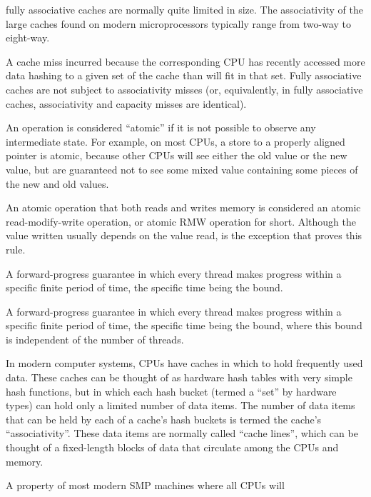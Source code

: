 \begin{description}
	fully associative caches are normally quite limited in size.
	The associativity of the large caches found on modern microprocessors
	typically range from two-way to eight-way.
\item[\IXGalth{Associativity Miss}{associativity}{cache miss}:]
	A cache miss incurred because the corresponding CPU has recently
	accessed more data hashing to a given set of the cache than will
	fit in that set.
	Fully associative caches are not subject to associativity misses
	(or, equivalently, in fully associative caches, associativity
	and capacity misses are identical).
\item[\IXG{Atomic}:]
	An operation is considered ``atomic'' if it is not possible to
	observe any intermediate state.
	For example, on most CPUs, a store to a properly aligned pointer
	is atomic, because other CPUs will see either the old value or
	the new value, but are guaranteed not to see some mixed value
	containing some pieces of the new and old values.
\item[\IXG{Atomic Read-Modify-Write Operation}:]
	An atomic operation that both reads and writes memory is
	considered an atomic read-modify-write operation, or atomic RMW
	operation for short.
	Although the value written usually depends on the value read,
	 is the exception that proves this rule.
\item[\IXGh{Bounded}{Wait Free}:]
	A forward-progress guarantee in which every thread makes
	progress within a specific finite period of time, the specific
	time being the bound.
\item[\IXGh{Bounded Population-Oblivious}{Wait Free}:]
	A forward-progress guarantee in which every thread makes
	progress within a specific finite period of time, the specific
	time being the bound, where this bound is independent of the
	number of threads.
\item[\IXG{Cache}:]
	In modern computer systems, CPUs have caches in which to hold
	frequently used data.
	These caches can be thought of as hardware hash tables with very
	simple hash functions,
	but in which each hash bucket (termed a ``set'' by hardware types)
	can hold only a limited number of data items.
	The number of data items that can be held by each of a cache's hash
	buckets is termed the cache's ``associativity''.
	These data items are normally called ``cache lines'', which
	can be thought of a fixed-length blocks of data that circulate
	among the CPUs and memory.
\item[\IXG{Cache Coherence}:]
	A property of most modern SMP machines where all CPUs will

\end{description}
